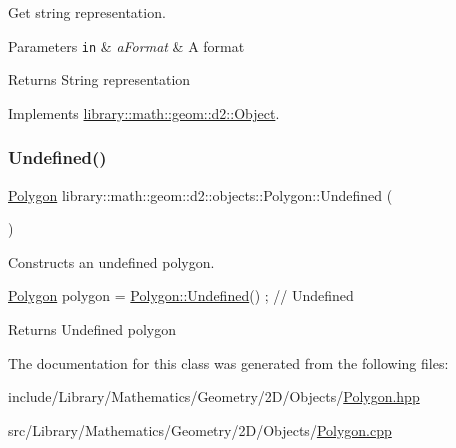 Get string representation. 


\begin{DoxyParams}[1]{Parameters}
\mbox{\tt in}  & {\em a\+Format} & A format \\
\hline
\end{DoxyParams}
\begin{DoxyReturn}{Returns}
String representation 
\end{DoxyReturn}


Implements \hyperlink{classlibrary_1_1math_1_1geom_1_1d2_1_1_object_acdd76b3637732a249536b609dbe3f0eb}{library\+::math\+::geom\+::d2\+::\+Object}.

\mbox{\label{classlibrary_1_1math_1_1geom_1_1d2_1_1objects_1_1_polygon_a86e2c184f51c1e93fce5a786457b9fc3}} 
\subsubsection{\texorpdfstring{Undefined()}{Undefined()}}
{\footnotesize\ttfamily \hyperlink{classlibrary_1_1math_1_1geom_1_1d2_1_1objects_1_1_polygon}{Polygon} library\+::math\+::geom\+::d2\+::objects\+::\+Polygon\+::\+Undefined (\begin{DoxyParamCaption}{ }\end{DoxyParamCaption})\hspace{0.3cm}{\ttfamily [static]}}



Constructs an undefined polygon. 


\begin{DoxyCode}
\hyperlink{classlibrary_1_1math_1_1geom_1_1d2_1_1objects_1_1_polygon_ad2a0b0bcd5301dbcd9e2fa101fbd220b}{Polygon} polygon = \hyperlink{classlibrary_1_1math_1_1geom_1_1d2_1_1objects_1_1_polygon_a86e2c184f51c1e93fce5a786457b9fc3}{Polygon::Undefined}() ; \textcolor{comment}{// Undefined}
\end{DoxyCode}


\begin{DoxyReturn}{Returns}
Undefined polygon 
\end{DoxyReturn}


The documentation for this class was generated from the following files\+:\begin{DoxyCompactItemize}
\item 
include/\+Library/\+Mathematics/\+Geometry/2\+D/\+Objects/\hyperlink{2_d_2_objects_2_polygon_8hpp}{Polygon.\+hpp}\item 
src/\+Library/\+Mathematics/\+Geometry/2\+D/\+Objects/\hyperlink{2_d_2_objects_2_polygon_8cpp}{Polygon.\+cpp}\end{DoxyCompactItemize}
